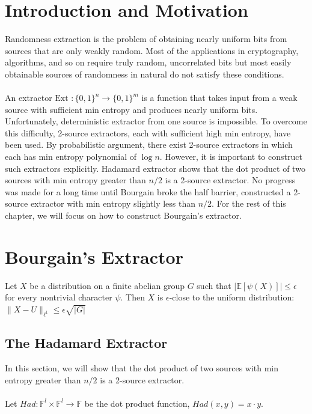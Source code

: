\section{Introduction and Motivation}

Randomness extraction is the problem of obtaining nearly uniform bits from sources that are 	only weakly random. Most of the applications in cryptography, algorithms, and so on require truly random, uncorrelated bits but most easily obtainable sources of randomness in natural do not satisfy these conditions. \\ \\
An extractor $\text{Ext } : \{ 0,1 \}^n \rightarrow \{0, 1 \} ^m$ is a function that takes input from a weak source with sufficient min entropy and produces nearly uniform bits. Unfortunately, deterministic extractor from one source is impossible. To overcome this difficulty, 2-source extractors, each with sufficient high min entropy, have been used. By probabilistic argument, there exist 2-source extractors in which each has min entropy polynomial of $\log n$. However, it is important to construct such extractors explicitly. Hadamard extractor shows that the dot product of two sources with min entropy greater than $n/2$ is a 2-source extractor. No progress was made for a long time until Bourgain broke the half barrier, constructed a 2-source extractor with min entropy slightly less than $n/2$. For the rest of this chapter, we will focus on how to construct Bourgain's extractor.

\section{Bourgain's Extractor}
\begin{lemma}
Let $X$ be a distribution on a finite abelian group $G$ such that $|\mathbb{E}[\psi (X)] | \leq \epsilon$ for every nontrivial character $\psi$. Then $X$ is $\epsilon$-close to the uniform distribution: $\| X - U \|_{\ell^1} \leq \epsilon \sqrt{|G|}$
\end{lemma}
\subsection{The Hadamard Extractor}
In this section, we will show that the dot product of two sources with min entropy greater than $n/2$ is a 2-source extractor. \\ \\
Let $Had: \mathbb{F}^l \times \mathbb{F}^l \rightarrow \mathbb{F}$ be the dot product function, $Had(x,y) = x \cdot y$. \\ \\

